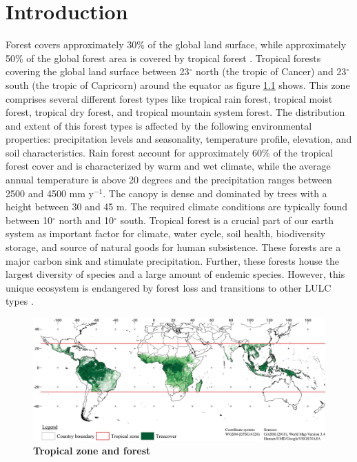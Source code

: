\chapter{Introduction}
\label{ch:introduction}
	Forest covers approximately 30\% of the global land surface, while approximately 50\% of the global forest area is covered by tropical forest \citep{WWF2016}. Tropical forests covering the global land surface between 23$^\circ$ north (the tropic of Cancer) and 23$^\circ$ south (the tropic of Capricorn) around the equator as figure \ref{fig:tropicalzone} shows. This zone comprises several different forest types like tropical rain forest, tropical moist forest, tropical dry forest, and tropical mountain system forest. The distribution and extent of this forest types is affected by the following environmental properties: precipitation levels and seasonality, temperature profile, elevation, and soil characteristics. Rain forest account for approximately 60\% of the tropical forest cover and is characterized by warm and wet climate, while the average annual temperature is above 20 degrees and the precipitation ranges between 2500 and 4500 mm y$^{-1}$. The canopy is dense and dominated by trees with a height between 30 and 45 m. The required climate conditions are typically found between 10$^\circ$ north and 10$^\circ$ south. Tropical forest is a crucial part of our earth system as important factor for climate, water cycle, soil health, biodiversity storage, and source of natural goods for human subsistence. These forests are a major carbon sink and stimulate precipitation. Further, these forests house the largest diversity of species and a large amount of endemic species. However, this unique ecosystem is endangered by forest loss and transitions to other \ac{LULC} types \citep{WWF2016}.
	\begin{figure}[ht]
		\centering
		\includegraphics[scale=.97]{img/intro_overview_frameless}
		\caption[Tropical zone and forest]{\textbf{Tropical zone and forest}}
		\label{fig:tropicalzone}
	\end{figure}

